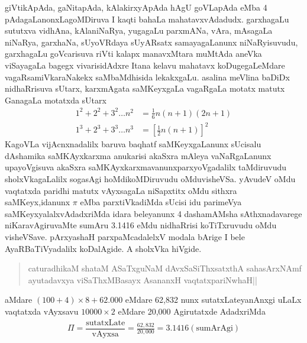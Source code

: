 giVtikApAda, gaNitapAda, kAlakirxyApAda hAgU goVLapAda eMba {\rm 4} pAdagaLanonxLagoMDiruva I kaqti bahaLa mahatavxvAdadudx. garxhagaLu sututxva vidhAna, kAla\-niNaRya, yugagaLu parxmANa, vAra, mAsagaLa niNaRya, garxhaNa, sUyoVRdaya sUyARsatx samayagaLanunx niNaRyisuvudu, garxhagaLu goVcarisuva riVti kalapx manavxM\-tara muMtAda aneVka viSayagaLa bagegx vivarisidAdxre Itana kelavu mahatavx koDugegaLeMdare vagaRsamiVkaraNakekx saMbaMdhisida lekakxgaLu. asalina meVlina baDiDx nidhaRrisuva sUtarx, karxmAgata saMKeyxgaLa vagaRgaLa motatx matutx GanagaLa motatxda sUtarx
\begin{align*}
1^{2}+2^{2}+3^{2}\ldots n^{2}&
=\frac{1}{6}n(n+1)(2n+1)\\
1^{3}+2^{3}+3^{3}\ldots n^{3} &
=\left[\frac{1}{2}n(n+1)\right]^{2}
\end{align*}
KagoVLa vijAcnxnadalilx baruva baqhatf saMKeyxgaLanunx sUcisalu dAshamika saMKAyxkarxma anukarisi akaSxra mAleya vaNaRgaLanunx upayoVgisuva akaSxra saMKAyxkarxmavanunx\break parxyoVgadalilx taMdiruvudu sholxVkagaLalilx sogasAgi hoMdikoMDiruvudu oMdu\break visheVSa. yAvudeV oMdu vaqtatxda paridhi matutx vAyxsagaLa niSapxtitx oMdu sithxra saMKeyx,\break idanunx $\pi$ eMba parxtiVkadiMda sUcisi idu parimeVya saMKeyxyalalxvAdadxriMda idara beleyanunx {\rm 4} dashamAMsha sAthxnadavarege niKaravAgiruvaMte sumAru {\rm 3.1416} eMdu nidhaRrisi koTiTxruvudu oMdu visheVSave. pArxyashaH parxpaMcadalelxV modala bArige I bele AyaRBaTiVyadalilx koDalAgide. A sholxVka hiVgide.
 
\begin{verse}
caturadhikaM shataM ASaTxguNaM dAvxSaSiThxsatxthA sahasArxNAmf\\
ayutadavxya viSaThxMBasayx AsananxH vaqtatxpariNwhaH||
\end{verse}

aMdare\; $(100+4) \times 8+62.000$\; eMdare {\rm 62,832} nunx sutatxLateyanAnxgi uLaLx vaqtatxda vAyxsavu\; $10000 \times 2$\; eMdare {\rm 20,000} Agirutatxde AdadxriMda
\begin{align*}
\Pi=\dfrac{\text{sutatxLate}}{\text{vAyxsa}}=\frac{62,832}{20,000}=3.1416 (\text{sumArAgi})
\end{align*}

